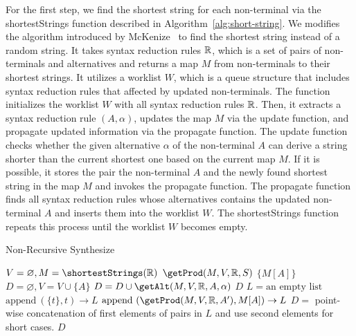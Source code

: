 For the first step, we find the shortest string for each non-terminal via the
\textsf{shortestStrings} function described in Algorithm~\ref{alg:short-string}.
We modifies the algorithm introduced by McKenize~\cite{cfg-gen} to find the
shortest string instead of a random string.  It takes syntax reduction rules
$\mathbb{R}$, which is a set of pairs of non-terminals and alternatives and
returns a map $M$ from non-terminals to their shortest strings.  It utilizes a
worklist $W$, which is a queue structure that includes syntax reduction rules
that affected by updated non-terminals.  The function initializes the worklist
$W$ with all syntax reduction rules $\mathbb{R}$.  Then, it extracts a syntax
reduction rule $(A, \alpha)$, updates the map $M$ via the \textsf{update}
function, and propagate updated information via the \textsf{propagate} function.
The \textsf{update} function checks whether the given alternative $\alpha$ of
the non-terminal $A$ can derive a string shorter than the current shortest one
based on the current map $M$.  If it is possible, it stores the pair the
non-terminal $A$ and the newly found shortest string in the map $M$ and invokes
the \textsf{propagate} function.  The \textsf{propagate} function finds all
syntax reduction rules whose alternatives contains the updated non-terminal $A$
and inserts them into the worklist $W$.  The \textsf{shortestStrings} function
repeats this process until the worklist $W$ becomes empty.

\begin{algorithm}[t]
  \caption{Non-Recursive Synthesize}
  \label{alg:non-rec-synthesize}
  \DontPrintSemicolon
   {
    $V = \varnothing, M = \shortestStrings(\ruleset)$\;
    \Return $\getProd(M, V, \ruleset, S)$\;
  }
   {
     {
      \Return $\{ M[A] \}$
    }
    $D = \varnothing, V = V \cup \{ A \}$\;
     {
      $D = D \cup \getAlt(M, V, \ruleset, A, \alpha)$\;
    }
    \Return $D$\;
  }
   {
    $L = \text{an empty list}$\;
     {
       {
        $\text{append}\ (\{ t \}, t) \rightarrow L$\;
      }
       {
        $\text{append}\ (\getProd(M, V, \ruleset, A'), M[A])
        \rightarrow L$\;
      }
    }
    $D =$ point-wise concatenation of first elements of pairs in $L$ and use
    second elements for short cases.\;
    \Return $D$\;
  }
\end{algorithm}


